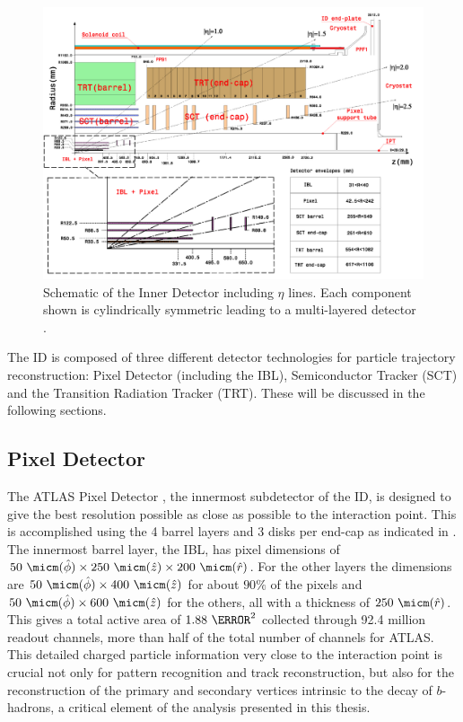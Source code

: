 \begin{figure}[!htbp]
  \begin{center}
    \includegraphics[width=0.8\linewidth]{figures/atlas/inner_detector_schematic}
    \caption{Schematic of the Inner Detector including $\eta$
lines.  Each component shown is cylindrically symmetric leading to a
multi-layered detector \cite{PIX-2018-001}.}
    \label{fig:inner_detector_schematic}
  \end{center}
\end{figure}

The ID is composed of three different detector technologies for particle
trajectory reconstruction: Pixel Detector (including the IBL), Semiconductor Tracker (SCT) and
the Transition Radiation Tracker (TRT).  These will be discussed in the
following sections. 

\subsection{Pixel Detector}

The ATLAS Pixel Detector \cite{PERF-2007-01}, the innermost subdetector of the ID, is designed to
give the best resolution possible as close as possible to the interaction point.
This is accomplished using the 4 barrel layers and 3 disks per end-cap as
indicated in . The innermost barrel
layer, the IBL, has pixel dimensions of $50~\micm(\hat{\phi}) \times 250~\micm
(\hat{z}) \times 200~\micm (\hat{r})$.  For the other layers the dimensions are
$50~\micm (\hat{\phi}) \times 400 ~\micm (\hat{z})$ for about $90\%$ of the pixels
and $50 ~\micm (\hat{\phi}) \times 600 ~\micm (\hat{z})$ for the others, all with a
thickness of $250 ~\micm (\hat{r})$.  This gives a total active area of $1.88~\meter^2$
collected through 92.4 million readout channels, more than half of the total
number of channels for ATLAS. This detailed charged particle information very
close to the interaction point is crucial not only for pattern recognition and
track reconstruction, but also for the reconstruction of the primary and
secondary vertices intrinsic to the decay of $b$-hadrons, a critical element
of the analysis presented in this thesis.

